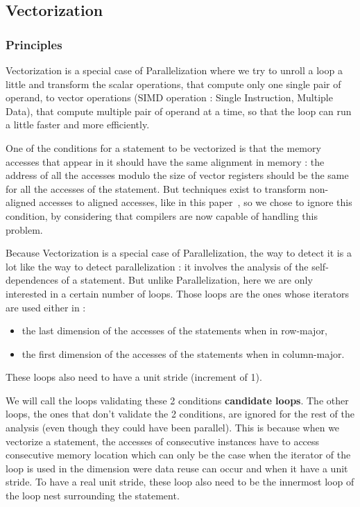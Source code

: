 \documentclass[paper=a4, fontsize=11.5pt]{scrartcl}
\numberwithin{equation}{section}        %
\numberwithin{figure}{section}          %
\numberwithin{table}{section}               %
\begin{document}
    \subsection{Vectorization}
        \subsubsection{Principles}
        Vectorization is a special case of Parallelization where we try to unroll a loop a
        little and transform the scalar operations, that compute only one single pair of
        operand, to vector operations (SIMD operation : Single Instruction, Multiple Data),
        that compute multiple pair of operand at a time, so that the loop can run a little
        faster and more efficiently.

        One of the conditions for a statement to be vectorized is that the memory accesses
        that appear in it should have the same alignment in memory : the address of all the
        accesses modulo the size of vector registers should be the same for all the accesses
        of the statement.
        But techniques exist to transform non-aligned accesses to aligned accesses, like
        in this paper~\cite{Eichenberger:2004:VSA:996893.996853}, so we chose to ignore this
        condition, by considering that compilers are now capable of handling this problem.

        Because Vectorization is a special case of Parallelization, the way to detect it
        is a lot like the way to detect parallelization : it involves the analysis of
        the \glspl{self-dependence} of a statement. But unlike Parallelization, here we are
        only interested in a certain number of loops. Those loops are the ones whose iterators
        are used either in :
        \begin{itemize}
            \item the last dimension of the accesses of the statements when in row-major,
            \item the first dimension of the accesses of the statements when in column-major.
        \end{itemize}
        These loops also need to have a unit stride (increment of 1).

        We will call the loops validating these 2 conditions \textbf{candidate loops}.
        The other loops, the ones that don't validate the 2 conditions, are ignored for
        the rest of the analysis (even though they could have been parallel). This is
        because when we vectorize a statement, the accesses of consecutive instances have
        to access consecutive memory location which can only be the case when the iterator
        of the loop is used in the dimension were data reuse can occur and when it have a unit stride.
        To have a real unit stride, these loop also need to be the innermost loop of the loop nest
        surrounding the statement.
        
\end{document}
